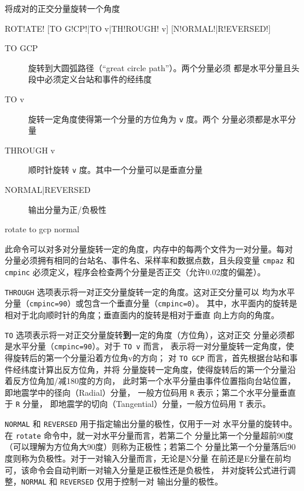 \label{cmd:rotate}

将成对的正交分量旋转一个角度

\begin{SACSTX}
ROT!ATE! [TO G!CP!|TO v|TH!ROUGH! v] [N!ORMAL!|R!EVERSED!]
\end{SACSTX}

\begin{description}
\item [TO GCP] 旋转到大圆弧路径（``great circle path''）。两个分量必须
    都是水平分量且头段中必须定义台站和事件的经纬度
\item [TO v] 旋转一定角度使得第一个分量的方位角为 \texttt{v} 度。两个
    分量必须都是水平分量
\item [THROUGH v] 顺时针旋转 \texttt{v} 度。其中一个分量可以是垂直分量
\item [NORMAL|REVERSED] 输出分量为正/负极性
\end{description}

\begin{SACDFT}
rotate to gcp normal
\end{SACDFT}

此命令可以对多对分量旋转一定的角度，内存中的每两个文件为一对分量。每对
分量必须拥有相同的台站名、事件名、采样率和数据点数，且头段变量 \texttt{cmpaz}
和 \texttt{cmpinc} 必须定义，程序会检查两个分量是否正交（允许0.02度的偏差）。

\texttt{THROUGH} 选项表示将一对正交分量旋转一定的角度。这对正交分量可以
均为水平分量（\texttt{cmpinc=90}）或包含一个垂直分量（\texttt{cmpinc=0}）。
其中，水平面内的旋转是相对于北向顺时针的角度；垂直面内的旋转是相对于垂直
向上方向的角度。

\texttt{TO} 选项表示将一对正交分量旋转\textbf{到}一定的角度（方位角），这对正交
分量必须都是水平分量（\texttt{cmpinc=90}）。对于 \texttt{TO v} 而言，
表示将一对分量旋转一定角度，使得旋转后的第一个分量沿着方位角v的方向；
对 \texttt{TO GCP} 而言，首先根据台站和事件经纬度计算出反方位角，并将
分量旋转一定角度，使得旋转后的第一个分量沿着反方位角加/减180度的方向，
此时第一个水平分量由事件位置指向台站位置，即地震学中的径向（Radial）分量，
一般方位码用 \texttt{R} 表示；第二个水平分量垂直于 \texttt{R} 分量，
即地震学的切向（Tangential）分量，一般方位码用 \texttt{T} 表示。

\texttt{NORMAL} 和 \texttt{REVERSED} 用于指定输出分量的极性，仅用于一对
水平分量的旋转中。在 \texttt{rotate} 命令中，就一对水平分量而言，若第二个
分量比第一个分量超前90度（可以理解为方位角大90度）则称为正极性；若第二个
分量比第一个分量落后90度则称为负极性。对于一对输入分量而言，无论是N分量
在前还是E分量在前均可，该命令会自动判断一对输入分量是正极性还是负极性，
并对旋转公式进行调整，\texttt{NORMAL} 和 \texttt{REVERSED} 仅用于控制一对
输出分量的极性。


